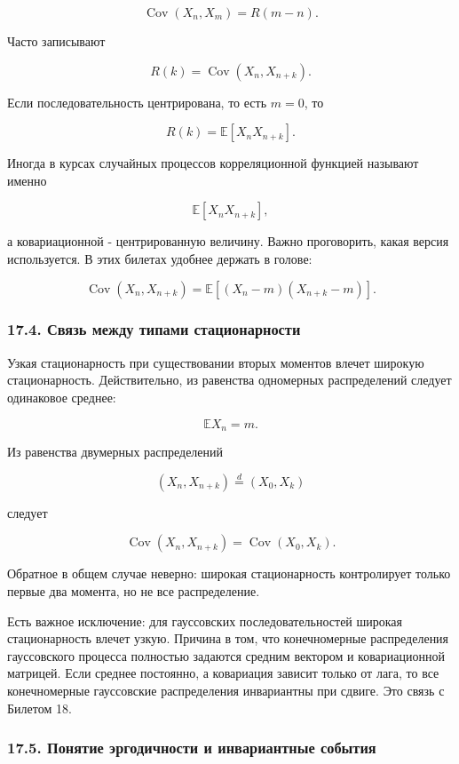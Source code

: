 \documentclass[
  11pt,
  a4paper,
]{article}
\begin{document}
\[
\operatorname{Cov}(X_n,X_m)=R(m-n).
\]

Часто записывают

\[
R(k)=\operatorname{Cov}(X_n,X_{n+k}).
\]

Если последовательность центрирована, то есть \(m=0\), то

\[
R(k)=\mathbb E[X_nX_{n+k}].
\]

Иногда в курсах случайных процессов корреляционной функцией называют
именно

\[
\mathbb E[X_nX_{n+k}],
\]

а ковариационной - центрированную величину. Важно проговорить, какая
версия используется. В этих билетах удобнее держать в голове:

\[
\operatorname{Cov}(X_n,X_{n+k})
=
\mathbb E[(X_n-m)(X_{n+k}-m)].
\]

\subsubsection{17.4. Связь между типами
стационарности}\label{ux441ux432ux44fux437ux44c-ux43cux435ux436ux434ux443-ux442ux438ux43fux430ux43cux438-ux441ux442ux430ux446ux438ux43eux43dux430ux440ux43dux43eux441ux442ux438}

Узкая стационарность при существовании вторых моментов влечет широкую
стационарность. Действительно, из равенства одномерных распределений
следует одинаковое среднее:

\[
\mathbb E X_n=m.
\]

Из равенства двумерных распределений

\[
(X_n,X_{n+k})\stackrel d=(X_0,X_k)
\]

следует

\[
\operatorname{Cov}(X_n,X_{n+k})
=
\operatorname{Cov}(X_0,X_k).
\]

Обратное в общем случае неверно: широкая стационарность контролирует
только первые два момента, но не все распределение.

Есть важное исключение: для гауссовских последовательностей широкая
стационарность влечет узкую. Причина в том, что конечномерные
распределения гауссовского процесса полностью задаются средним вектором
и ковариационной матрицей. Если среднее постоянно, а ковариация зависит
только от лага, то все конечномерные гауссовские распределения
инвариантны при сдвиге. Это связь с Билетом 18.

\subsubsection{17.5. Понятие эргодичности и инвариантные
события}\label{ux43fux43eux43dux44fux442ux438ux435-ux44dux440ux433ux43eux434ux438ux447ux43dux43eux441ux442ux438-ux438-ux438ux43dux432ux430ux440ux438ux430ux43dux442ux43dux44bux435-ux441ux43eux431ux44bux442ux438ux44f}
\end{document}
